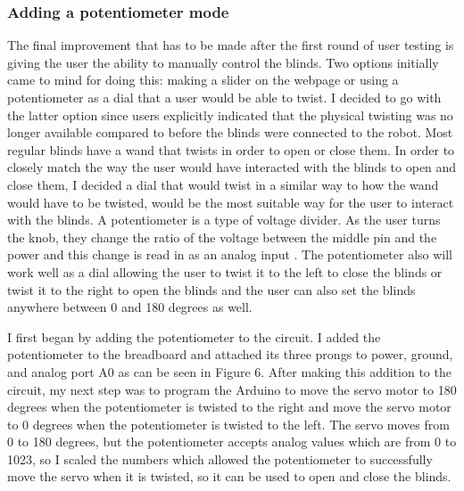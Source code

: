 \documentclass[10pt,twocolumn]{article}
\begin{document}
\subsubsection{Adding a potentiometer mode}
The final improvement that has to be made after the first round of user testing is giving the user the ability to manually control the blinds. Two options initially came to mind for doing this: making a slider on the webpage or using a potentiometer as a dial that a user would be able to twist. I decided to go with the latter option since users explicitly indicated that the physical twisting was no longer available compared to before the blinds were connected to the robot. Most regular blinds have a wand that twists in order to open or close them. In order to closely match the way the user would have interacted with the blinds to open and close them, I decided a dial that would twist in a similar way to how the wand would have to be twisted, would be the most suitable way for the user to interact with the blinds. A potentiometer is a type of voltage divider. As the user turns the knob, they change the ratio of the voltage between the middle pin and the power and this change is read in as an analog input \cite{Fitzgerald2015Arduino}. The potentiometer also will work well as a dial allowing the user to twist it to the left to close the blinds or twist it to the right to open the blinds and the user can also set the blinds anywhere between 0 and 180 degrees as well.

I first began by adding the potentiometer to the circuit. I added the potentiometer to the breadboard and attached its three prongs to power, ground, and analog port A0 as can be seen in Figure 6. After making this addition to the circuit, my next step was to program the Arduino to move the servo motor to 180 degrees when the potentiometer is twisted to the right and move the servo motor to 0 degrees when the potentiometer is twisted to the left. The servo moves from 0 to 180 degrees, but the potentiometer accepts analog values which are from 0 to 1023, so I scaled the numbers which allowed the potentiometer to successfully move the servo when it is twisted, so it can be used to open and close the blinds.
\end{document}
